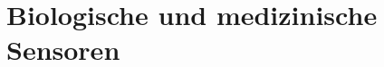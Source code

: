 \section{Biologische und medizinische Sensoren}
\begin{frame}
    \frametitle{\insertsection}

    

\end{frame}